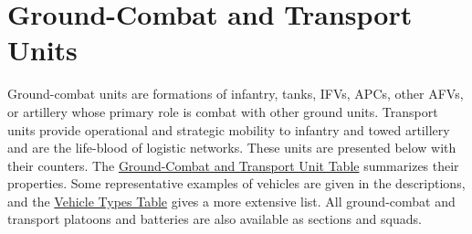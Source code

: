 


\chapter{Ground-Combat and Transport Units}
\raggedbottom

Ground-combat units are formations of infantry, tanks, IFVs, APCs, other AFVs, or artillery whose primary role is combat with other ground units. Transport units provide operational and strategic mobility to infantry and towed artillery and are the life-blood of logistic networks.
These units are presented below with their counters.
The \hyperlink{table:ground-combat-units}{Ground-Combat and Transport Unit Table} summarizes their properties.
Some representative examples of vehicles are given in the descriptions, and the \hyperlink{table:vehicle-types}{Vehicle Types Table} gives a more extensive list.
All ground-combat and transport platoons and batteries are also available as sections and squads.%

